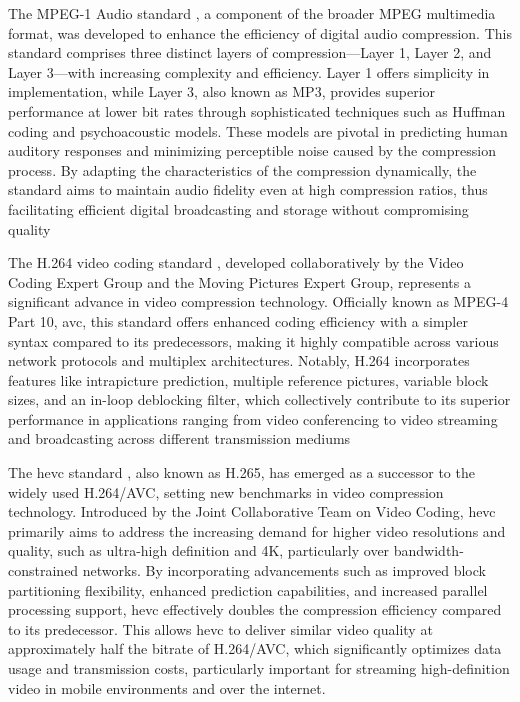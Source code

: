 \documentclass{ioereport}
\begin{document}
The MPEG-1 Audio standard \cite{mp3_1994}, a component of the broader MPEG multimedia format, was developed to enhance the efficiency of digital audio compression. This standard comprises three distinct layers of compression—Layer 1, Layer 2, and Layer 3—with increasing complexity and efficiency. Layer 1 offers simplicity in implementation, while Layer 3, also known as MP3, provides superior performance at lower bit rates through sophisticated techniques such as Huffman coding and psychoacoustic models. These models are pivotal in predicting human auditory responses and minimizing perceptible noise caused by the compression process. By adapting the characteristics of the compression dynamically, the standard aims to maintain audio fidelity even at high compression ratios, thus facilitating efficient digital broadcasting and storage without compromising quality

The H.264 video coding standard \cite{h264_2006}, developed collaboratively by the Video Coding Expert Group and the Moving Pictures Expert Group, represents a significant advance in video compression technology. Officially known as MPEG-4 Part 10, \gls{avc}, this standard offers enhanced coding efficiency with a simpler syntax compared to its predecessors, making it highly compatible across various network protocols and multiplex architectures. Notably, H.264 incorporates features like intrapicture prediction, multiple reference pictures, variable block sizes, and an in-loop deblocking filter, which collectively contribute to its superior performance in applications ranging from video conferencing to video streaming and broadcasting across different transmission mediums

The \gls{hevc} standard \cite{h265_2012}, also known as H.265, has emerged as a successor to the widely used H.264/AVC, setting new benchmarks in video compression technology. Introduced by the Joint Collaborative Team on Video Coding, \gls{hevc} primarily aims to address the increasing demand for higher video resolutions and quality, such as ultra-high definition and 4K, particularly over bandwidth-constrained networks. By incorporating advancements such as improved block partitioning flexibility, enhanced prediction capabilities, and increased parallel processing support, \gls{hevc} effectively doubles the compression efficiency compared to its predecessor. This allows \gls{hevc} to deliver similar video quality at approximately half the bitrate of H.264/AVC, which significantly optimizes data usage and transmission costs, particularly important for streaming high-definition video in mobile environments and over the internet.
\end{document}
